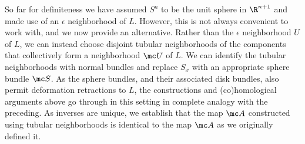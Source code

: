 \begin{example}
\begin{comment}
	we need to consider the co-orientation of the the piece of $\bd \mr T$ corresponding to $V^0$.
	We have


	Once again,
	\begin{itemize}
	\item the $V^0$ terms should cancel once I get the signs right,
	\item since $\bd V \in Q^*(S^n-L)$ it follows that $(\bd V)^-$ and $\bd V^0=-(\bd V)^0$ are in $Q^*(S^n-L)$,
	\item and then $\bd V^0 \times [0,1) \in Q^*(S^n-L)$ since the homotopy is universal.
	\end{itemize}
	\end{comment}






\begin{remark}\label{R: Alex tubular}
So far for definiteness we have assumed $S^n$ to be the unit sphere in $\R^{n+1}$ and made use of an $\epsilon$ neighborhood of $L$.
However, this is not always convenient to work with, and we now provide an alternative.
Rather than the $\epsilon$ neighborhood $U$ of $L$, we can instead choose disjoint tubular neighborhoods of the components that collectively form a neighborhood $\mc U$ of $L$.
We can identify the tubular neighborhoods with normal bundles and replace $S_x$ with an appropriate sphere bundle $\mc S$.
As the sphere bundles, and their associated disk bundles, also permit deformation retractions to $L$, the constructions and (co)homological arguments above go through in this setting in complete analogy with the preceding.
As inverses are unique, we establish that the map $\mc A$ constructed using tubular neighborhoods is identical to the map $\mc A$ as we originally defined it.
\end{remark}






\end{example}